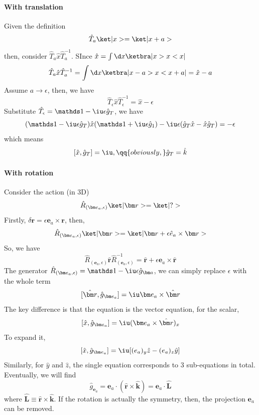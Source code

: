 \paragraph{With translation}

Given the definition
\[
  \hat T_a\ket|x> = \ket|x + a>
\]
then, consider $\hat T_a \hat x \hat T_a^{-1}$.
SInce $\hat x = \int \d x \ketbra|x> x <x|$
\[
  \hat T_a \hat x \hat T_a^{-1}
= \int \d x \ketbra|x - a> x <x + a| = \hat x - a
\]
Assume $a \to \epsilon$, then, we have
\[
  \hat T_\epsilon \hat x \hat T_\epsilon^{-1} = \hat x - \epsilon
\]
Substitute $\hat T_\epsilon = \identity - \iu\epsilon\hat g_T$, we have
\[
  (\identity - \iu\epsilon \hat g_T) \hat x (\identity + \iu\epsilon \hat g_1)
- \iu\epsilon(\hat g_T\hat x - \hat x \hat g_T) = -\epsilon
\]
which means
\[
  [\hat x, \hat g_T] = \iu, \qq{obviously,} \hat g_T = \hat k
\]

\paragraph{With rotation}

Consider the action (in 3D)
\[
  \hat R_{(\bm e_a, \epsilon)} \ket|\bm r> = \ket|?>
\]
Firstly, $\delta\bm r = \epsilon \bm e_a \times \bm r$, then,
\[
  \hat R_{(\bm e_a, \epsilon)} \ket|\bm r>
= \ket|\bm r + \epsilon \hat e_a \times \bm r>
\]
So, we have
\[
  \hat R_{(\bm e_a,\epsilon)} \hat{\bm r} \hat R_{(\bm e_a,\epsilon)}^{-1}
= \hat{\bm r} + \epsilon \bm e_a \times \hat{\bm r}
\]
The generator
$\hat R_{(\bm e_a,\epsilon)} = \identity - \iu\epsilon \hat g_{\bm a}$,
we can simply replace $\epsilon$ with the whole term
\[
  [\hat{\bm r}, \hat g_{\bm e_a}] = \iu\bm e_a \times \hat{\bm r}
\]
The key difference is that the equation is the vector equation, for the scalar,
\[
  [\hat x, \hat g_{\bm e_a}] = \iu(\bm e_a \times \hat{\bm r})_x
\]
To expand it,
\[
  [\hat x, \hat g_{\bm e_a}] = \iu [(e_a)_y\hat z - (e_a)_z \hat y]
\]
Similarly, for $\hat y$ and $\hat z$, the single equation corresponds to 3
sub-equations in total.
Eventually, we will find
\[
  \hat g_{\bm e_a} = \bm e_a \cdot(\hat{\bm r} \times \hat{\bm k})
= \bm e_a \cdot \hat{\bm L}
\]
where $\hat{\bm L} \equiv \hat{\bm r} \times \hat{\bm k}$.
If the rotation is actually the symmetry, then, the projection $\bm e_a$ can be
removed.

